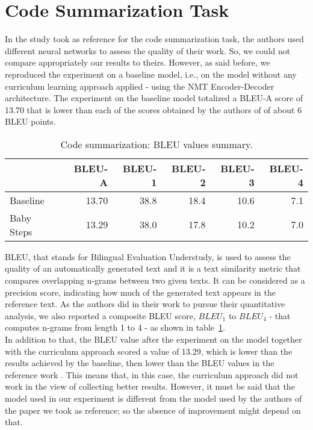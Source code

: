 \section{Code Summarization Task}\label{section:cdtask}
In the study took as reference for the code summarization task, the authors used different neural networks to 
assess the quality of their work. So, we could not compare appropriately our results to theirs.
However, as said before, we reproduced the experiment on a baseline model,
i.e., on the model without any curriculum learning approach applied - using the NMT Encoder-Decoder architecture.
The experiment on the baseline model totalized a BLEU-A score of 13.70 that is lower than 
each of the scores obtained by the authors of \cite{Leclair2020} of about 6 BLEU points. 
\begin{table}[h!]
    \centering
    \begin{tabular}{l|r|r|r|r|r}
     & BLEU-A & BLEU-1 & BLEU-2 & BLEU-3 & BLEU-4\\ [0.5ex] 
     \hline
     Baseline & 13.70 & 38.8 & 18.4 & 10.6 & 7.1\\  
     Baby Steps & 13.29 & 38.0 & 17.8 & 10.2 & 7.0\\ [1ex]
     \end{tabular}
    \caption{Code summarization: BLEU values summary.}
    \label{table:1}
\end{table}
BLEU, that stands for Bilingual Evaluation Understudy, is used to assess the quality of an automatically 
generated text and it is a text similarity metric that compares
overlapping n-grams between two given texts. It can be considered as a precision score, indicating how much 
of the generated text appears in the reference text. 
As the authors did in their work to pursue their quantitative analysis, we also reported a composite BLEU score, $BLEU_1$ to 
$BLEU_4$ - that computes 
n-grams from length 1 to 4 - as shown in table~\ref{table:1}.\\
In addition to that, the BLEU value after the experiment on the model together with the curriculum approach
scored a value of 13.29, which is lower than the results achieved by the baseline, then lower than the BLEU values in the 
reference work \cite{Leclair2020}.
This means that, in this case, the curriculum approach did not work in the view of collecting better results.
However, it must be said that the model used in our experiment is different from the 
model used by the authors of the paper we took as reference; so the absence of improvement might
depend on that.\\
